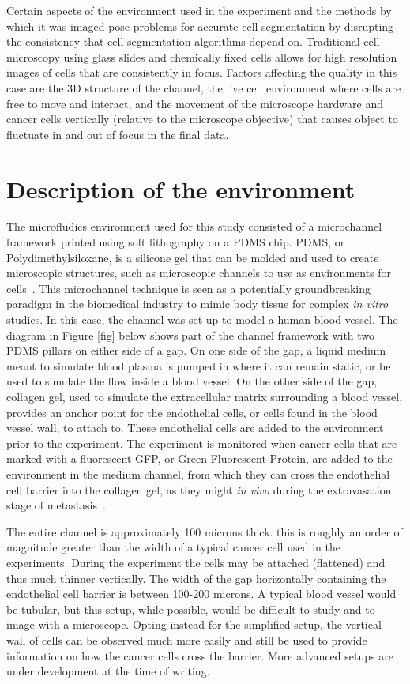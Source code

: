 Certain aspects of the environment used in the experiment and the methods by which it was imaged pose problems for accurate cell segmentation by disrupting the consistency that cell segmentation algorithms depend on. Traditional cell microscopy using glass slides and chemically fixed cells allows for high resolution images of cells that are consistently in focus. Factors affecting the quality in this case are the 3D structure of the channel, the live cell environment where cells are free to move and interact, and the movement of the microscope hardware and cancer cells vertically (relative to the microscope objective) that causes object to fluctuate in and out of focus in the final data.

\section{Description of the environment}

The microfludics environment used for this study consisted of a microchannel framework printed using soft lithography on a PDMS chip. PDMS, or Polydimethylsiloxane, is a silicone gel that can be molded and used to create microscopic structures, such as microscopic channels to use as environments for cells~\cite{Zheng:10}\cite{Herold:09}\cite{Halldorsson:15}. This microchannel technique is seen as a potentially groundbreaking paradigm in the biomedical industry to mimic body tissue for complex \emph{in vitro} studies. In this case, the channel was set up to model a human blood vessel. The diagram in Figure [fig] below shows part of the channel framework with two PDMS pillars on either side of a gap. On one side of the gap, a liquid medium meant to simulate blood plasma is pumped in where it can remain static, or be used to simulate the flow inside a blood vessel. On the other side of the gap, collagen gel, used to simulate the extracellular matrix surrounding a blood vessel, provides an anchor point for the endothelial cells, or cells found in the blood vessel wall, to attach to. These endothelial cells are added to the environment prior to the experiment. The experiment is monitored when cancer cells that are marked with a fluorescent GFP, or Green Fluorescent Protein, are added to the environment in the medium channel, from which they can cross the endothelial cell barrier into the collagen gel, as they might \emph{in vivo} during the extravasation stage of metastasis~\cite{Reymond:13}.

The entire channel is approximately 100 microns thick. this is roughly an order of magnitude greater than the width of a typical cancer cell used in the experiments. During the experiment the cells may be attached (flattened) and thus much thinner vertically. The width of the gap horizontally containing the endothelial cell barrier is between 100-200 microns. A typical blood vessel would be tubular, but this setup, while possible, would be difficult to study and to image with a microscope. Opting instead for the simplified setup, the vertical wall of cells can be observed much more easily and still be used to provide information on how the cancer cells cross the barrier. More advanced setups are under development at the time of writing.

